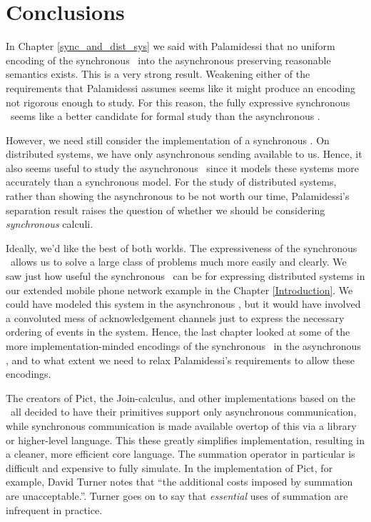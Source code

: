 \chapter{Conclusions}
In Chapter \ref{sync_and_dist_sys} we said with Palamidessi that no uniform encoding of the synchronous \picalc\ into the asynchronous \picalc preserving reasonable semantics exists.  This is a very strong result.  Weakening either of the requirements that Palamidessi assumes seems like it might produce an encoding not rigorous enough to study.  
For this reason, the fully expressive synchronous \picalc\ seems like a better candidate for formal study than the asynchronous \picalc.

However, we need still consider the implementation of a synchronous \picalc.  
On distributed systems, we have only asynchronous sending available to us.  
Hence, it also seems useful to study the asynchronous \picalc\ since it models these systems more accurately than a synchronous model.
For the study of distributed systems, rather than showing the asynchronous to be not worth our time, Palamidessi's separation result raises the question of whether we should be considering \emph{synchronous} calculi. 

Ideally, we'd like the best of both worlds.  The expressiveness of the synchronous \picalc\ allows us to solve a large class of problems much more easily and clearly.
We saw just how useful the synchronous \picalc\ can be for expressing distributed systems in our extended mobile phone network example in the Chapter \ref{Introduction}.
We could have modeled this system in the asynchronous \picalc, but it would have involved a convoluted mess of acknowledgement channels just to express the necessary ordering of events in the system.
Hence, the last chapter looked at some of the more implementation-minded encodings of the synchronous \picalc\ in the asynchronous \picalc, and to what extent we need to relax Palamidessi's requirements to allow these encodings.

The creators of Pict, the Join-calculus, and other implementations based on the \picalc\ all decided to have their primitives support only asynchronous communication, while synchronous communication is made available overtop of this via a library or higher-level language.  
This these greatly simplifies implementation, resulting in a cleaner, more efficient core language.  
The summation operator in particular is difficult and expensive to fully simulate.  
In the implementation of Pict, for example, David Turner notes \cite{turner96} that ``the additional costs imposed by summation are unacceptable.''.  
Turner goes on to say that \emph{essential} uses of summation are infrequent in practice.


